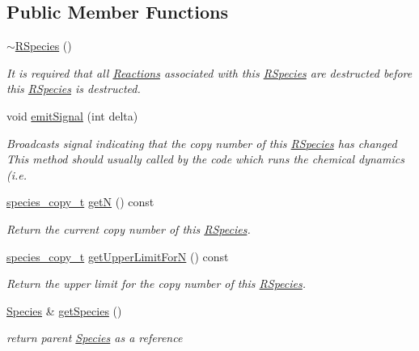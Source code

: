 \subsection*{Public Member Functions}
\begin{DoxyCompactItemize}
\item 
\hyperlink{classchem_1_1RSpecies_a3c875e360f7f53b2ca8bd30f7dbbb7ed}{$\sim$\-R\-Species} ()
\begin{DoxyCompactList}\small\item\em It is required that all \hyperlink{classchem_1_1Reaction}{Reactions} associated with this \hyperlink{classchem_1_1RSpecies}{R\-Species} are destructed before this \hyperlink{classchem_1_1RSpecies}{R\-Species} is destructed. \end{DoxyCompactList}\item 
void \hyperlink{classchem_1_1RSpecies_afaee31bbc312ca6fa84a9ffc02457611}{emit\-Signal} (int delta)
\begin{DoxyCompactList}\small\item\em Broadcasts signal indicating that the copy number of this \hyperlink{classchem_1_1RSpecies}{R\-Species} has changed This method should usually called by the code which runs the chemical dynamics (i.\-e. \end{DoxyCompactList}\item 
\hyperlink{common_8h_a3503f321fd36304ee274141275cca586}{species\-\_\-copy\-\_\-t} \hyperlink{classchem_1_1RSpecies_a5a96cf2a67af375c6471dfa5a21990f8}{get\-N} () const 
\begin{DoxyCompactList}\small\item\em Return the current copy number of this \hyperlink{classchem_1_1RSpecies}{R\-Species}. \end{DoxyCompactList}\item 
\hyperlink{common_8h_a3503f321fd36304ee274141275cca586}{species\-\_\-copy\-\_\-t} \hyperlink{classchem_1_1RSpecies_ad233880e065382e598a95e75d401d9eb}{get\-Upper\-Limit\-For\-N} () const 
\begin{DoxyCompactList}\small\item\em Return the upper limit for the copy number of this \hyperlink{classchem_1_1RSpecies}{R\-Species}. \end{DoxyCompactList}\item 
\hyperlink{classchem_1_1Species}{Species} \& \hyperlink{classchem_1_1RSpecies_a585ae6da09ba09c824aac7a0fcddd748}{get\-Species} ()
\begin{DoxyCompactList}\small\item\em return parent \hyperlink{classchem_1_1Species}{Species} as a reference \end{DoxyCompactList}\item 

\end{DoxyCompactItemize}
